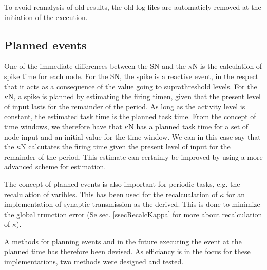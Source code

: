 To avoid reanalysis of old results, the old log files are automaticly removed at the initiation of the execution.







\subsection{Planned events}
	\label{secPlannedEvents}
	One of the immediate differences between the SN and the $\kappa$N is the calculation of spike time for each node.
	For the SN, the spike is a reactive event, in the respect that it acts as a consequence of the value going to suprathreshold levels.
	For the $\kappa$N, a spike is planned by estimating the firing timen, given that the present level of input lasts for the remainder of the period. %
	As long as the activity level is constant, the estimated task time is the planned task time.
	From the concept of time windows, we therefore have that $\kappa$N has a planned task time for a set of node input and an initial value for the time window. %
	We can in this case say that the $\kappa$N calcutates the firing time given the present level of input for the remainder of the period.
	This estimate can certainly be improved by using a more advanced scheme for estimation.

	The concept of planned events is also important for periodic tasks, e.g. the recalulation of varibles. 
	This has been used for the recalcualation of $\kappa$ for an implementation of synaptic transmission as the derived.
	This is done to minimize the global trunction error (Se sec. \ref{ssecRecalcKappa} for more about recalculation of $\kappa$).

	A methods for planning events and in the future executing the event at the planned time has therefore been devised.
	As efficiancy is in the focus for these implementations, two methods were designed and tested.
	
